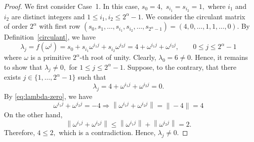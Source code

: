 \documentclass[12pt]{article}
\begin{document}
\begin{proof}
We first consider Case~1. In this case,
$
s_0=4,$ $s_{i_1}=s_{i_2}=1,
$ where \(i_1\) and \(i_2\) are distinct integers and \(1\le i_1,i_2\le 2^{\alpha}-1\). We consider the circulant matrix of order \(2^{\alpha}\) with first row
$
(s_0,s_1,\ldots,s_{i_1},s_{i_2},\ldots,s_{2^{\alpha}-1})
=
(4,0,\ldots,1,1,\ldots,0)
$.
By Definition~\ref{circulant}, we have
\[
\lambda_j=f(\omega^j)
=s_0+s_{i_1}\omega^{i_1j}+s_{i_2}\omega^{i_2j}
=4+\omega^{i_1j}+\omega^{i_2j},
\qquad
0\le j\le 2^{\alpha}-1
\]
where $\omega$ is a primitive $2^{\alpha}$-th root of unity. Clearly,
$
\lambda_0=6\neq0.
$
Hence, it remains to show that
$
\lambda_j\neq0,$ for
$1\le j\le 2^{\alpha}-1.$ Suppose, to the contrary, that there exists
\(j\in\{1,\ldots,2^{\alpha}-1\}\) such that
\begin{equation}\label{eq:lambda-zero}
	\lambda_j
	=
	4+\omega^{i_1j}+\omega^{i_2j}
	=
	0.
\end{equation}
By \eqref{eq:lambda-zero}, we have
\[
\omega^{i_1j}+\omega^{i_2j}=-4
\Longrightarrow
\left\|\omega^{i_1j}+\omega^{i_2j}\right\|
=\|-4\|
=4
\]
On the other hand,
\[
\left\|\omega^{i_1j}+\omega^{i_2j}\right\|
\le
\left\|\omega^{i_1j}\right\|
+
\left\|\omega^{i_2j}\right\|
=2.
\]
Therefore,
$
4\le2,
$
which is a contradiction. Hence,
$
\lambda_j\neq0.
$


\end{proof}
\end{document}
